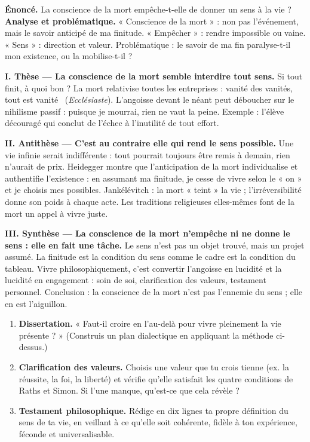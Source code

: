 \documentclass[11pt]{article}
\begin{document}
\begin{exoresolu}
\textbf{Énoncé.} La conscience de la mort empêche-t-elle de donner un sens à la vie ?
\tcblower
\textbf{Analyse et problématique.} « Conscience de la mort » : non pas l'événement, mais le savoir anticipé de ma finitude. « Empêcher » : rendre impossible ou vaine. « Sens » : direction et valeur. Problématique : le savoir de ma fin paralyse-t-il mon existence, ou la mobilise-t-il ?

\textbf{I. Thèse — La conscience de la mort semble interdire tout sens.} Si tout finit, à quoi bon ? La mort relativise toutes les entreprises : \guillemotleft vanité des vanités, tout est vanité \guillemotright\ (\emph{Ecclésiaste}). L'angoisse devant le néant peut déboucher sur le nihilisme passif : puisque je mourrai, rien ne vaut la peine. Exemple : l'élève découragé qui conclut de l'échec à l'inutilité de tout effort.

\textbf{II. Antithèse — C'est au contraire elle qui rend le sens possible.} Une vie infinie serait indifférente : tout pourrait toujours être remis à demain, rien n'aurait de prix. Heidegger montre que l'anticipation de la mort individualise et authentifie l'existence : en assumant ma finitude, je cesse de vivre selon le « on » et je choisis mes possibles. Jankélévitch : la mort « teint » la vie ; l'irréversibilité donne son poids à chaque acte. Les traditions religieuses elles-mêmes font de la mort un appel à vivre juste.

\textbf{III. Synthèse — La conscience de la mort n'empêche ni ne donne le sens : elle en fait une tâche.} Le sens n'est pas un objet trouvé, mais un projet assumé. La finitude est la condition du sens comme le cadre est la condition du tableau. Vivre philosophiquement, c'est convertir l'angoisse en lucidité et la lucidité en engagement : soin de soi, clarification des valeurs, testament personnel. Conclusion : la conscience de la mort n'est pas l'ennemie du sens ; elle en est l'aiguillon.
\end{exoresolu}

\begin{exercice}
\begin{enumerate}
  \item \textbf{Dissertation.} « Faut-il croire en l'au-delà pour vivre pleinement la vie présente ? » (Construis un plan dialectique en appliquant la méthode ci-dessus.)
  \item \textbf{Clarification des valeurs.} Choisis une valeur que tu crois tienne (ex. la réussite, la foi, la liberté) et vérifie qu'elle satisfait les quatre conditions de Raths et Simon. Si l'une manque, qu'est-ce que cela révèle ?
  \item \textbf{Testament philosophique.} Rédige en dix lignes ta propre définition du sens de ta vie, en veillant à ce qu'elle soit cohérente, fidèle à ton expérience, féconde et universalisable.
\end{enumerate}
\end{exercice}
\end{document}
